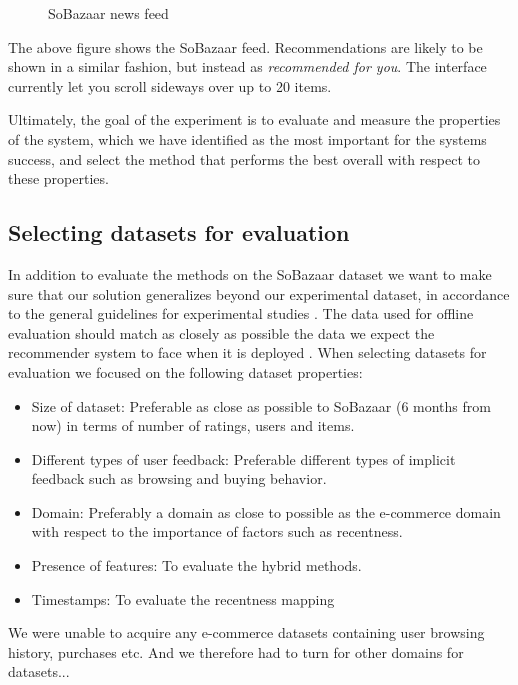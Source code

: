 \begin{figure}[H]
\begin{minipage}{.45\linewidth}
		\end{minipage}
		\caption[SoBazaar news feed - version 0.5.1]{SoBazaar news feed}
		\label{figure:SoBazaarfeed}
\end{figure}


The above figure shows the SoBazaar feed. Recommendations are likely to be shown in a similar fashion, but instead as \emph{recommended for you}. The interface currently let you scroll sideways over up to 20 items.

Ultimately, the goal of the experiment is to evaluate and measure the properties
of the system, which we have identified as the most important for the systems success,
and select the method that performs the best overall with respect to these properties.

\subsection{Selecting datasets for evaluation}

In addition to evaluate the methods on the SoBazaar dataset we want to make sure that our
solution generalizes beyond our experimental dataset, in accordance to the general guidelines
for experimental studies \cite{Shani2011}. The data used for offline evaluation should match
as closely as possible the data we expect the recommender system to face when it is
deployed \cite{Gunawardana2009}. When selecting datasets for evaluation we focused on the
following dataset properties:

\begin{itemize}
	\item Size of dataset: Preferable as close as possible to SoBazaar (6 months from now)
	in terms of number of ratings, users and items.
	\item Different types of user feedback: Preferable different types of implicit feedback
	such as browsing and buying behavior.
	\item Domain: Preferably a domain as close to possible as the e-commerce domain with respect
	to the importance of factors such as recentness.
	\item Presence of features: To evaluate the hybrid methods.
	\item Timestamps: To evaluate the recentness mapping
\end{itemize}

We were unable to acquire any e-commerce datasets containing user browsing history, purchases etc.
And we therefore had to turn for other domains for datasets...

